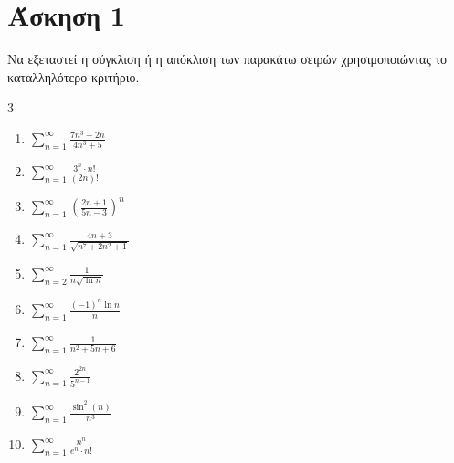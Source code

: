\documentclass[11pt,a4paper]{article}
\begin{document}
\section*{Άσκηση 1}
Να εξεταστεί η σύγκλιση ή η απόκλιση των παρακάτω σειρών χρησιμοποιώντας το καταλληλότερο κριτήριο.
\begin{multicols}{3}
\begin{enumerate}
\item $\displaystyle\sum_{n=1}^{\infty} \frac{7n^3 - 2n}{4n^3 + 5}$ 
\item $\displaystyle\sum_{n=1}^{\infty} \frac{3^n \cdot n!}{(2n)!}$ 
\item $\displaystyle\sum_{n=1}^{\infty} \left( \frac{2n+1}{5n-3} \right)^{n}$ %
\item $\displaystyle\sum_{n=1}^{\infty} \frac{4n+3}{\sqrt{n^7+2n^2+1}}$ 
\item $\displaystyle\sum_{n=2}^{\infty} \frac{1}{n \sqrt{\ln n}}$ 
\item $\displaystyle\sum_{n=1}^{\infty} \frac{(-1)^n \ln n}{n}$ 
\item $\displaystyle\sum_{n=1}^{\infty} \frac{1}{n^2+5n+6}$ 
\item $\displaystyle\sum_{n=1}^{\infty} \frac{2^{2n}}{5^{n-1}}$ 
\item $\displaystyle\sum_{n=1}^{\infty} \frac{\sin^2(n)}{n^3}$ 
\item $\displaystyle\sum_{n=1}^{\infty} \frac{n^n}{e^n \cdot n!}$ 
\end{enumerate}
\end{multicols}
\vspace{0.5cm}
\hrulefill
\end{document}
